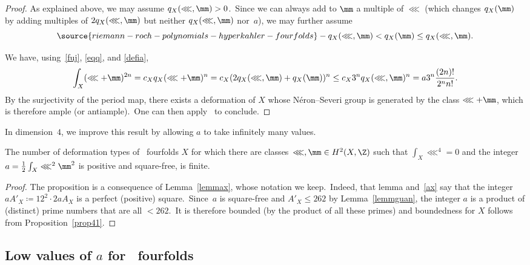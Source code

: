 \begin{proof}
As explained above, we may assume $q_X(\lll,\mm)>0$.\
Since we can always add to $\mm$ a  multiple of $\lll$ (which changes $q_X(\mm)$ by adding multiples of $2q_X(\lll,\mm)$ but neither $q_X(\lll,\mm)$ nor~$a$), we may further assume
\begin{equation}\label{eqq}
\source{riemann-roch-polynomials-hyperkahler-fourfolds}
-q_X(\lll,\mm)<q_X(\mm)\le q_X(\lll,\mm).
\end{equation}

We have, using~\eqref{fuj}, \eqref{eqq}, and \eqref{defia},
\begin{equation*}
\int_X(\lll+\mm)^{2n}=c_X q_X(\lll+\mm)^n =c_X(2 q_X(\lll,\mm)+q_X(\mm) )^n\le c_X 3^n q_X(\lll,\mm)^n= a 3^n\frac{(2n)!}{2^nn!}  .
\end{equation*}
By the surjectivity of the period map, there exists a deformation of $X$ whose N\'eron--Severi group is generated by the class $\lll+\mm$, which is therefore ample (or antiample).\
One can then apply~\cite[Corollary~1.2]{huyf} to conclude.
\end{proof}



 In dimension~$4$, we improve this result by allowing $a$ to take infinitely many values.\


\begin{prop}
\notready\label{prop42}
The number of deformation types of  \hk\ fourfolds $X$   for which there are classes~$\lll, \mm\in H^2(X,\Z)$ such that   \mbox{$\int_X \lll^4=0$} and  the   integer $a= \frac{1}{2}\int_X \lll^{2}\mm^{2}$ is positive and square-free, is finite.\end{prop}



\begin{proof}
The proposition is a consequence of Lemma~\ref{lemmax}, whose notation we keep.\ Indeed, that lemma and~\eqref{ax}
 say that the integer $aA'_X\coloneqq 12^2 \cdot 2aA_X$ is a perfect (positive) square.\
Since~$a$ is square-free and $A'_X\le 262$ by Lemma~\ref{lemmguan}, the integer $a$ is a product of (distinct) prime numbers that are all $<262$.\
It is therefore bounded (by the product of all these primes) and boundedness for $X$ follows from Proposition~\ref{prop41}.
\end{proof}


\subsection{Low values of $a$ for \hk\ fourfolds}

